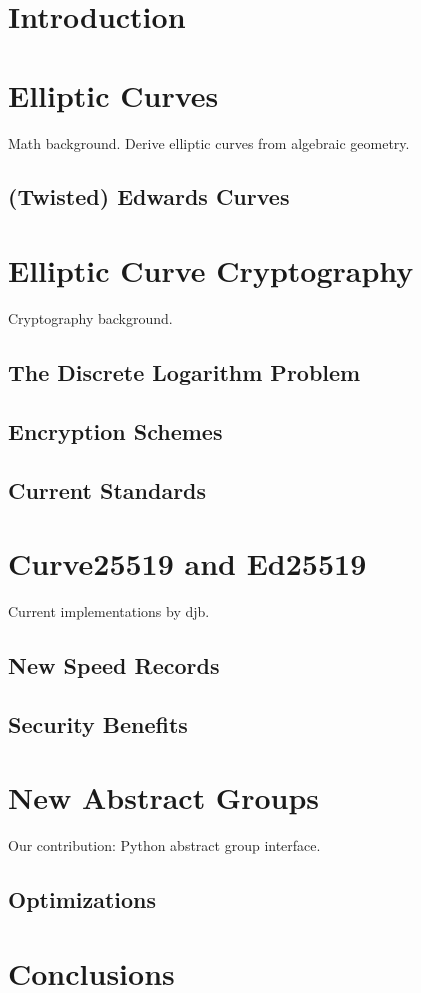 \documentclass[11pt,letterpaper,notitlepage]{article}
\begin{document}
\section{Introduction} 
	
\section{Elliptic Curves} 
	Math background. Derive elliptic curves from algebraic geometry. 
	\subsection{(Twisted) Edwards Curves} 
	
\section{Elliptic Curve Cryptography} 
	Cryptography background. 
	\subsection{The Discrete Logarithm Problem} 
	\subsection{Encryption Schemes} 
	\subsection{Current Standards}

\section{Curve25519 and Ed25519} 
	Current implementations by djb. 
	\subsection{New Speed Records} 
	\subsection{Security Benefits} 
	
\section{New Abstract Groups} 
	Our contribution: Python abstract group interface. 
	\subsection{Optimizations} 
\section{Conclusions} 
\end{document}
